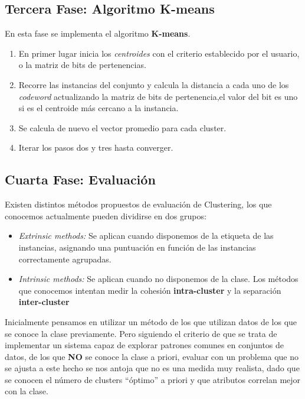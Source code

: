 \documentclass[10pt,a4paper]{article}
\begin{document}
\subsection*{Tercera Fase: Algoritmo K-means}

En esta fase se implementa el algoritmo \textbf{K-means}.
\begin{enumerate}
	\item En primer lugar inicia los \textit{centroides} con el criterio establecido por el usuario, o la matriz de bits de pertenencias.
	\item Recorre las instancias del conjunto y calcula la distancia a cada uno de los \textit{codeword} actualizando la matriz de bits de pertenencia,el valor 		del bit es uno si es el centroide más cercano a la instancia.
	\item Se calcula de nuevo el vector promedio para cada cluster.
	\item Iterar los pasos dos y tres hasta converger.
\end{enumerate}

\subsection*{Cuarta Fase: Evaluación}

Existen distintos métodos propuestos de evaluación de Clustering, los que conocemos actualmente pueden dividirse en dos grupos:
\begin{itemize}
	\item \emph{Extrinsic methods: } Se aplican cuando disponemos de la etiqueta de las instancias, asignando una puntuación en función de las instancias correctamente agrupadas.
	
	\item \emph{Intrinsic methods: } Se aplican cuando no disponemos de la clase. Los métodos que conocemos intentan medir la cohesión \textbf{intra-cluster} y la separación \textbf{inter-cluster}
\end{itemize}

Inicialmente pensamos  en utilizar un método de los que utilizan datos de los que se conoce la clase previamente. Pero siguiendo el criterio de que se trata de implementar un sistema capaz de explorar patrones comunes en conjuntos de datos, de los que \textbf{NO} se conoce la clase a priori, evaluar con un problema que no se ajusta a este hecho se nos antoja que no es una medida muy realista, dado que se conocen el número de clusters ``óptimo'' a priori y que atributos correlan mejor con la clase.\\
\end{document}
